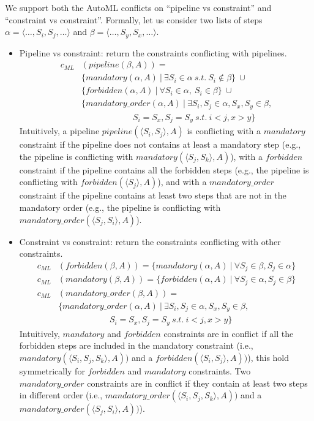 \documentclass[5p,times]{elsarticle}
\begin{document}
We support both the AutoML conflicts on ``pipeline vs constraint'' and ``constraint vs constraint''. 
Formally, let us consider two lists of steps $\alpha = \langle \ldots, S_i, S_j, \ldots \rangle$ and $\beta = \langle \ldots, S_y, S_x, \ldots \rangle$.
\begin{itemize}
    \item Pipeline vs constraint: return the constraints conflicting with pipelines.
    \begin{align*}
    c_{ML}&(pipeline(\beta, A)) = \\
        &\{mandatory(\alpha, A)~|~\exists S_i \in \alpha~s.t.~S_i \notin \beta\}~\cup \\
        &\{forbidden(\alpha, A)~|~\forall S_i \in \alpha,~S_i \in \beta \}~\cup\\
        &\{mandatory\_order(\alpha, A)~|~\exists S_i, S_j \in \alpha, S_x, S_y \in \beta, \\&\qquad\qquad\qquad S_i = S_x, S_j = S_y~s.t.~i < j, x > y\}
    \end{align*}
    Intuitively, a pipeline $pipeline(\langle S_i, S_j \rangle, A)$ is conflicting with a $mandatory$ constraint if the pipeline does not contains at least a mandatory step (e.g., the pipeline is conflicting with $mandatory(\langle S_j, S_k \rangle, A)$), with a $forbidden$ constraint if the pipeline contains all the forbidden steps (e.g., the pipeline is conflicting with $forbidden(\langle S_j \rangle, A)$), and with a $mandatory\_order$ constraint if the pipeline contains at least two steps that are not in the mandatory order (e.g., the pipeline is conflicting with $mandatory\_order(\langle S_j, S_i \rangle, A)$).
    \item Constraint vs constraint: return the constraints conflicting with other constraints.
    \begin{align*}
        c_{ML}&(forbidden(\beta, A)) = \{mandatory(\alpha, A)~|~\forall S_j \in \beta, S_j \in \alpha\}\\
        c_{ML}&(mandatory(\beta, A)) = \{forbidden(\alpha, A)~|~\forall S_j \in \alpha, S_j \in \beta\}\\
        c_{ML}&(mandatory\_order(\beta, A)) = \\
        &\{mandatory\_order(\alpha, A)~|~\exists S_i, S_j \in \alpha, S_x, S_y \in \beta, \\&\qquad\qquad\qquad S_i = S_x, S_j = S_y~s.t.~i < j, x > y\}
    \end{align*}
    Intuitively, $mandatory$ and $forbidden$ constraints are in conflict if all the forbidden steps are included in the mandatory constraint (i.e.,  $mandatory(\langle S_i, S_j, S_k \rangle, A))$ and a $forbidden(\langle S_i, S_j \rangle, A))$), this hold symmetrically for $forbidden$ and $mandatory$ constraints. Two $mandatory\_order$ constraints are in conflict if they contain at least two steps in different order (i.e.,  $mandatory\_order(\langle S_i, S_j, S_k \rangle, A))$ and a $mandatory\_order(\langle S_j, S_i \rangle, A))$).
\end{itemize}
\end{document}
